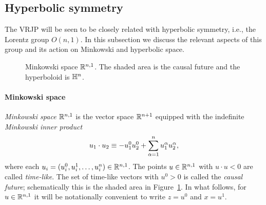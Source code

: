 \documentclass[11pt,a4paper]{article}
\begin{document}
\subsection{Hyperbolic symmetry}
\label{sec:hyperb-spin-model}

The VRJP will be seen to be closely related with hyperbolic symmetry,
i.e., the Lorentz group $O(n,1)$.  In this subsection we discuss the
relevant aspects of this group and its action on Minkowski and
hyperbolic space.

\begin{figure}
\begin{center}
  
\end{center}
\caption{Minkowski space $\mathbb{R}^{n,1}$. The shaded area is the causal future 
  and the hyperboloid is $\mathbb{H}^n$.\label{fig:minkowski}}
\end{figure}

\paragraph{Minkowski space}

\emph{Minkowski space $\mathbb{R}^{n,1}$} is the vector space
$\mathbb{R}^{n+1}$ equipped with the indefinite \emph{Minkowski inner product}
\begin{equation}
  \label{eq:Mip}
  u_1 \cdot u_2
  \equiv
  - u_1^{0} u_2^{0}  + \sum_{\alpha=1}^n u_1^\alpha u_2^\alpha,
\end{equation}
where each
$u_{i} = (u^{0}_{i},u^1_{i}, \dots, u_{i}^{n})\in \mathbb{R}^{n,1}$.  The
points $u \in \mathbb{R}^{n,1}$ with $u\cdot u < 0$ are called
\emph{time-like}. The set of time-like vectors with $u^0>0$ is called
the \emph{causal future}; schematically this is the shaded area in
Figure~\ref{fig:minkowski}.  In what follows, for $u\in \mathbb{R}^{n,1}$ it
will be notationally convenient to write $z=u^{0}$ and $x=u^1$.
\end{document}
